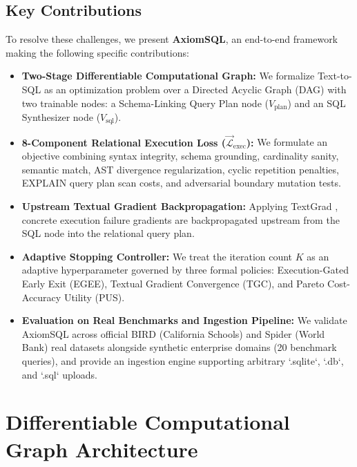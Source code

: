 \documentclass[conference]{IEEEtran}
\begin{document}
\subsection{Key Contributions}
To resolve these challenges, we present \textbf{AxiomSQL}, an end-to-end framework making the following specific contributions:
\begin{itemize}
    \item \textbf{Two-Stage Differentiable Computational Graph:} We formalize Text-to-SQL as an optimization problem over a Directed Acyclic Graph (DAG) with two trainable nodes: a Schema-Linking Query Plan node ($V_{\text{plan}}$) and an SQL Synthesizer node ($V_{\text{sql}}$).
    \item \textbf{8-Component Relational Execution Loss ($\vec{\mathcal{L}}_{\text{exec}}$):} We formulate an objective combining syntax integrity, schema grounding, cardinality sanity, semantic match, AST divergence regularization, cyclic repetition penalties, EXPLAIN query plan scan costs, and adversarial boundary mutation tests.
    \item \textbf{Upstream Textual Gradient Backpropagation:} Applying TextGrad \cite{yuksekgonul2024textgrad}, concrete execution failure gradients are backpropagated upstream from the SQL node into the relational query plan.
    \item \textbf{Adaptive Stopping Controller:} We treat the iteration count $K$ as an adaptive hyperparameter governed by three formal policies: Execution-Gated Early Exit (EGEE), Textual Gradient Convergence (TGC), and Pareto Cost-Accuracy Utility (PUS).
    \item \textbf{Evaluation on Real Benchmarks and Ingestion Pipeline:} We validate AxiomSQL across official BIRD (California Schools) and Spider (World Bank) real datasets alongside synthetic enterprise domains (20 benchmark queries), and provide an ingestion engine supporting arbitrary `.sqlite`, `.db`, and `.sql` uploads.
\end{itemize}

\section{Differentiable Computational Graph Architecture}
\end{document}
